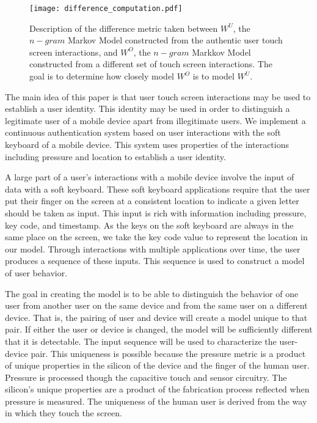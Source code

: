 \begin{figure*}
\centering
\texttt{[image: difference\_computation.pdf]}
\caption{
Description of the difference metric taken between
$W^U$, the $n-gram$ Markov Model constructed from the authentic user touch screen interactions,
and $W^O$, the $n-gram$ Markkov Model constructed 
from a different set of touch screen interactions.
%
The goal is to determine how closely model $W^O$ is to model $W^U$.
}
\label{fig:difference_computation}
\end{figure*}

The main idea of this paper is that user
touch screen interactions may be used 
to establish a user identity.
%
This identity may be used in order to
distinguish a legitimate user of a mobile device apart from
illegitimate users.
%
We implement a continuous authentication system
based on user interactions with the soft keyboard of
a mobile device.
This system uses properties of the interactions including
pressure and location
to establish a user identity.

A large part of a user's interactions with a mobile
device involve the input of data with a soft keyboard.
These soft keyboard applications require that
the user put their finger on the screen at a consistent
location to indicate a given letter should be taken as input.
This input is rich with information including
pressure,
key code, and
timestamp.
As the keys on the soft keyboard are always in the same place on the screen,
we take the key code value to represent the location in our model.
Through interactions with multiple applications over time,
the user produces a sequence of these inputs.
This sequence is used to construct a model of user behavior.

The goal in creating the model
is to be able to distinguish the behavior
of one user from 
another user on the same device and
from the same user on a different device.
That is, the pairing of user and device will
create a model unique to that pair.
If either the user or device is changed,
the model will be sufficiently different
that it is detectable.
The input sequence will be used to characterize the user-device pair.
This uniqueness is possible because
the pressure metric is a product of 
unique properties in
the silicon of the device and
the finger of the human user.
%
Pressure is processed though the capacitive touch and sensor circuitry.
The silicon's unique properties
are a product of the fabrication process %
reflected when pressure is measured.
The uniqueness of the human user is derived from
the way in which they touch the screen.

